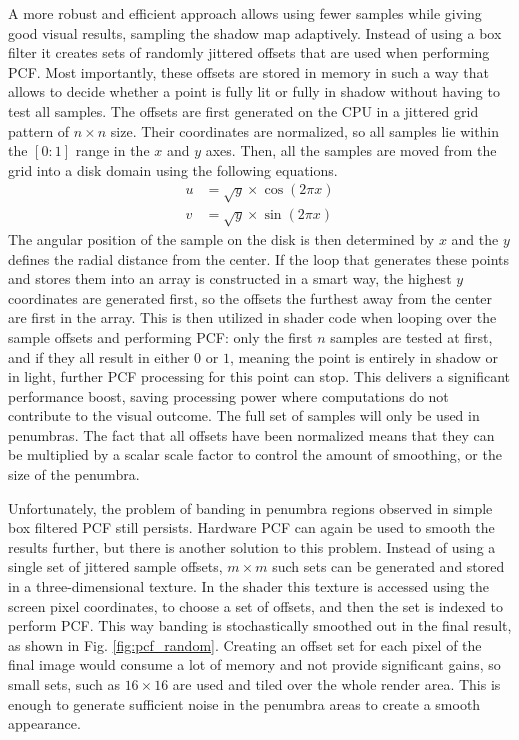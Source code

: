 A more robust and efficient approach allows using fewer samples while giving good visual results, sampling the shadow map adaptively. Instead of using a box filter it creates sets of randomly jittered offsets that are used when performing PCF. Most importantly, these offsets are stored in memory in such a way that allows to decide whether a point is fully lit or fully in shadow without having to test all samples. The offsets are first generated on the CPU in a jittered grid pattern of \(n\times n\) size. Their coordinates are normalized, so all samples lie within the \([0:1]\) range in the \(x\) and \(y\) axes. Then, all the samples are moved from the grid into a disk domain using the following equations.
\begin{align}
	u &= \sqrt{y} \times \cos(2\pi x)\\[10pt]
	v &= \sqrt{y} \times \sin(2\pi x)
\end{align}
The angular position of the sample on the disk is then determined by \(x\) and the \(y\) defines the radial distance from the center. If the loop that generates these points and stores them into an array is constructed in a smart way, the highest \(y\) coordinates are generated first, so the offsets the furthest away from the center are first in the array. This is then utilized in shader code when looping over the sample offsets and performing PCF: only the first \(n\) samples are tested at first, and if they all result in either \(0\) or \(1\), meaning the point is entirely in shadow or in light, further PCF processing for this point can stop. This delivers a significant performance boost, saving processing power where computations do not contribute to the visual outcome. The full set of samples will only be used in penumbras. The fact that all offsets have been normalized means that they can be multiplied by a scalar scale factor to control the amount of smoothing, or the size of the penumbra.

Unfortunately, the problem of banding in penumbra regions observed in simple box filtered PCF still persists. Hardware PCF can again be used to smooth the results further, but there is another solution to this problem. Instead of using a single set of jittered sample offsets, \(m\times m\) such sets can be generated and stored in a three-dimensional texture. In the shader this texture is accessed using the screen pixel coordinates, to choose a set of offsets, and then the set is indexed to perform PCF. This way banding is stochastically smoothed out in the final result, as shown in Fig. \ref{fig:pcf_random}. Creating an offset set for each pixel of the final image would consume a lot of memory and not provide significant gains, so small sets, such as \(16\times 16\) are used and tiled over the whole render area. This is enough to generate sufficient noise in the penumbra areas to create a smooth appearance.

